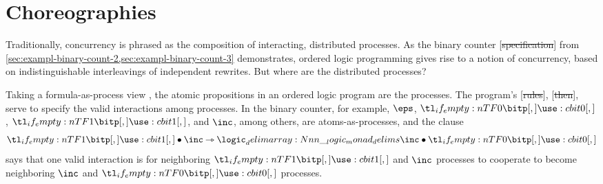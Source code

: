\section{Choreographies}\label{sec:choreographies}

Traditionally, concurrency is phrased as the composition of interacting, distributed processes.
As the binary counter [\st{specification}] from \cref{sec:exampl-binary-count-2,sec:exampl-binary-count-3} demonstrates, ordered logic programming gives rise to a notion of concurrency, based on indistinguishable interleavings of independent rewrites.
But where are the distributed processes?

Taking a formula-as-process view \autocites{Miller:ELP92}{Cervesato+Scedrov:IC09}, the atomic propositions in an ordered logic program are the processes.
The program's [\st{rules}], [\st{then}], serve to specify the valid interactions among processes. 
In the binary counter,
for example, $\eps$, $\bit{0}$, $\bit{1}$, and $\inc$, among others,
are
atoms-as-processes,
and the clause
\begin{equation*}
  \bit{1} \fuse \inc \lrimp \monad{\inc \fuse \bit{0}}
\end{equation*}
says that one valid interaction is for neighboring $\bit{1}$ and $\inc$ processes to cooperate to become neighboring $\inc$ and $\bit{0}$ processes.


